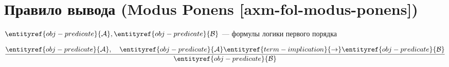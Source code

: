 
\section{Правило вывода (Modus Ponens [axm-fol-modus-ponens])}

\hypertarget{axm-fol-modus-ponens}{}
\hypertarget{axm-fol-modus-ponens}{}
\begin{axiom}
\label{entity:axm-fol-modus-ponens}
$\entityref{obj-predicate}{\mathcal{A}}, \entityref{obj-predicate}{\mathcal{B}}$ --- формулы логики первого порядка

\[
\frac{\entityref{obj-predicate}{\mathcal{A}}, \quad \entityref{obj-predicate}{\mathcal{A}} \entityref{term-implication}{\to} \entityref{obj-predicate}{\mathcal{B}}}{\entityref{obj-predicate}{\mathcal{B}}}
\]
\end{axiom}